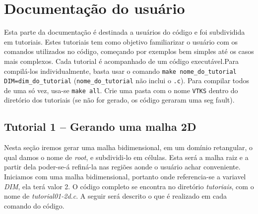 \chapter{Documentação do usuário}

Esta parte da documentação é destinada a usuários do código e foi subdividida
em tutoriais. Estes tutoriais tem como objetivo familiarizar o usuário
com os comandos utilizados no código, começando por exemplos bem simples até os
casos mais complexos. Cada tutorial é acompanhado de um código executável.Para compilá-los individualmente, basta usar o comando \texttt{make nome\_do\_tutorial} \\
\texttt{DIM=dim\_do\_tutorial} (\texttt{nome\_do\_tutorial} não inclui o \texttt{.c}). Para compilar todos de uma só vez, usa-se \texttt{make all}. Crie uma pasta com o nome \texttt{VTKS} dentro do diretório dos tutoriais (se não for gerado, os código geraram uma seg fault).


\section{Tutorial 1 -- Gerando uma malha 2D}

Nesta seção iremos gerar uma malha bidimensional, em um domínio retangular,
o qual damos o nome de {\it root}, e subdividi-lo em células. Esta
será a malha raiz e a partir dela poder-se-á
refiná-la nas regiões aonde o usuário achar conveniente.  Iniciamos com uma
malha bidimensional, portanto onde referencia-se a variavel {\it DIM}, ela terá valor 2.
O código completo se encontra no
diretório {\it tutoriais}, com o nome de {\it tutorial01-2d.c}. A seguir será descrito o
que é realizado em cada comando do código.

